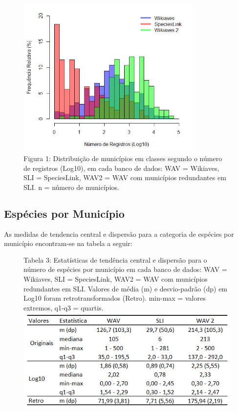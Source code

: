 \newpage

\begin{figure}[h!]
\centering
\includegraphics[height = 8cm]{Imagens/H01.png}
\\{\scriptsize Figura 1: Distribuição de municípios em classes segundo o número de registros (Log10), em cada banco de dados: WAV = Wikiaves, SLI = SpeciesLink, WAV2 = WAV com municípios redundantes em SLI. n = número de municípios.  }
\end{figure}

\subsection{Espécies por Município}

\begin{resposta}
As medidas de tendencia central e dispersão para a categoria de espécies por município encontram-se na tabela a seguir: 
\end{resposta}


\begin{figure}[h!]
\centering
{\scriptsize Tabela 3: Estatísticas de tendência central e dispersão para o número de espécies por município em cada banco de dados: WAV = Wikiaves, SLI = SpeciesLink, WAV2 = WAV com municípios redundantes em SLI. Valores de média (m) e desvio-padrão (dp) em Log10 foram retrotransformados (Retro). min-max = valores extremos, q1-q3 = quartis.}
\includegraphics{Imagens/T03.png}
\end{figure}

